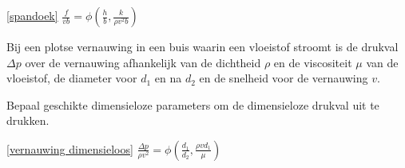 \begin{antwoord}{\ref{spandoek}}
	$\frac{f}{vb} = \phi\left( \frac{h}{b},\frac{k}{\rho v^2 b} \right)$
\end{antwoord}
\begin{toepassing}
	\label{vernauwing dimensieloos}
Bij een plotse vernauwing in een buis waarin een vloeistof stroomt is de drukval $\Delta p$ over de vernauwing afhankelijk van de dichtheid $\rho$ en de viscositeit $\mu$ van de vloeistof, de diameter voor $d_1$ en na $d_2$ en de snelheid voor de vernauwing $v$.

Bepaal geschikte dimensieloze parameters om de dimensieloze drukval uit te drukken. 
\end{toepassing}
\begin{antwoord}{\ref{vernauwing dimensieloos}}
	$\frac{\Delta p}{\rho v^2} = \phi\left( \frac{d_1}{d_2},\frac{\rho v d_1}{\mu} \right)$
\end{antwoord}